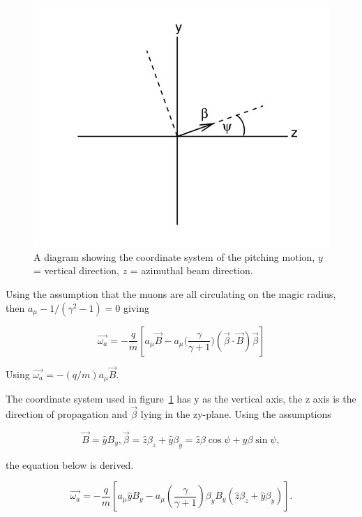 \begin{figure}[ht]
\centering
\includegraphics[scale=0.5]{Figures/pitcheffect.png}
\decoRule
\caption{A diagram showing the coordinate system of the pitching motion, $y$ = vertical direction, $z$ = azimuthal beam direction.}
\label{fig:pitcheffect.png}
\end{figure}

Using the assumption that the muons are all circulating on the magic radius, then $a_{\mu} - 1/(\gamma^{2}-1)=0 $ giving

\begin{equation}
\vec{\omega_{a}}=-\frac{q}{m}[a_{\mu}\vec{B}-a_{\mu}\Big(\frac{\gamma}{\gamma+1}\Big)(\vec{\beta}\cdot\vec{B})\vec{\beta}]
\end{equation}

\noindent
Using $\vec{\omega_{a}}=-(q/m)a_{\mu}\vec{B}$. 

The coordinate system used in figure~\ref{fig:pitcheffect.png} has y as the vertical axis, the z axis is the direction of propagation and $\vec{\beta}$ lying in the zy-plane. Using the assumptions

\begin{equation}
\vec{B}=\hat{y}B_{y}, \vec{\beta}=\hat{z}\beta_{z}+\hat{y}\beta_{y}=\hat{z}\beta \cos{\psi} + \hat{y}\beta \sin{\psi}, 
\end{equation}

\noindent
the equation below is derived.

\begin{equation}
\vec{\omega_{a}} = - \frac{q}{m}[a_{\mu}\hat{y}B_{y}-a_{\mu}(\frac{\gamma}{\gamma + 1})\beta_{y}B_{y}(\hat{z}\beta_{z}+\hat{y}\beta_{y})].
\end{equation}

